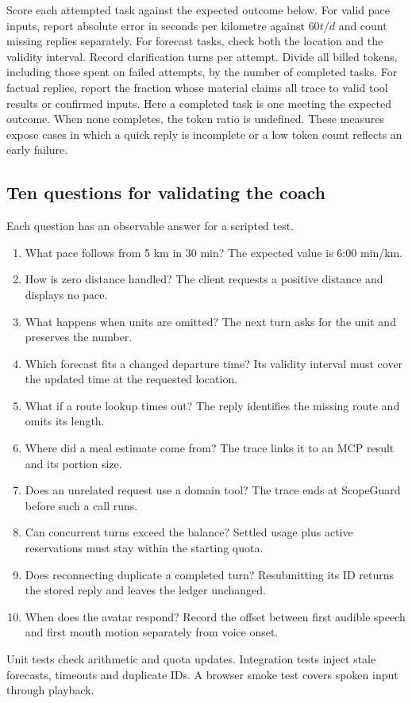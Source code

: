 \documentclass[conference]{IEEEtran}
\begin{document}
Score each attempted task against the expected outcome below. For valid pace inputs, report absolute error in seconds per kilometre against $60t/d$ and count missing replies separately. For forecast tasks, check both the location and the validity interval. Record clarification turns per attempt. Divide all billed tokens, including those spent on failed attempts, by the number of completed tasks. For factual replies, report the fraction whose material claims all trace to valid tool results or confirmed inputs. Here a completed task is one meeting the expected outcome. When none completes, the token ratio is undefined. These measures expose cases in which a quick reply is incomplete or a low token count reflects an early failure.
\subsection{Ten questions for validating the coach}
Each question has an observable answer for a scripted test.
\begin{enumerate}
\item What pace follows from 5 km in 30 min? The expected value is 6:00 min/km.
\item How is zero distance handled? The client requests a positive distance and displays no pace.
\item What happens when units are omitted? The next turn asks for the unit and preserves the number.
\item Which forecast fits a changed departure time? Its validity interval must cover the updated time at the requested location.
\item What if a route lookup times out? The reply identifies the missing route and omits its length.
\item Where did a meal estimate come from? The trace links it to an MCP result and its portion size.
\item Does an unrelated request use a domain tool? The trace ends at ScopeGuard before such a call runs.
\item Can concurrent turns exceed the balance? Settled usage plus active reservations must stay within the starting quota.
\item Does reconnecting duplicate a completed turn? Resubmitting its ID returns the stored reply and leaves the ledger unchanged.
\item When does the avatar respond? Record the offset between first audible speech and first mouth motion separately from voice onset.
\end{enumerate}
Unit tests check arithmetic and quota updates. Integration tests inject stale forecasts, timeouts and duplicate IDs. A browser smoke test covers spoken input through playback.
\end{document}
